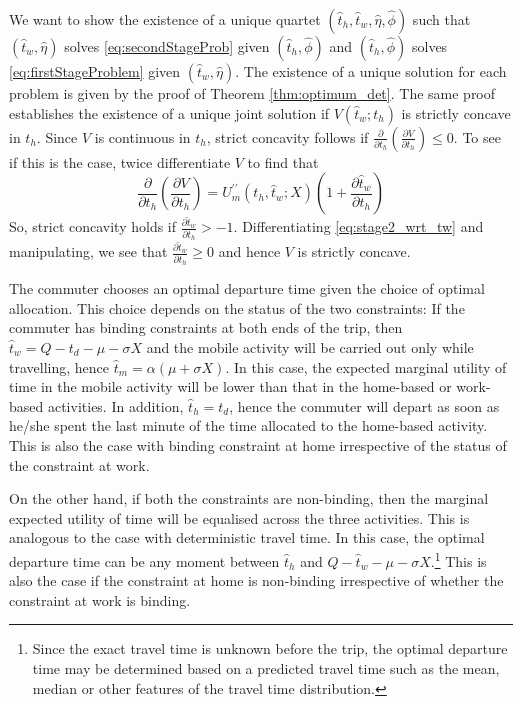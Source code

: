 \documentclass[12pt,a4paper,british]{article}
\makeatletter
\newenvironment{proof}[1][\proofname]{\par
    \normalfont\topsep6\p@\@plus6\p@\relax
    \trivlist
    \itemindent\parindent
    \item[\hskip\labelsep
          \scshape
      #1]\ignorespaces
  }{%
    \endtrivlist\@endpefalse
  }
\providecommand{\proofname}{Proof}
\makeatother
\begin{document}
\begin{proof}
We want to show the existence of a unique quartet $\left( \hat{t}_{h},\hat{t}_{w}, \hat{\eta},\hat{\phi}\right)$ such that $\left( \hat{t}_{w}, \hat{\eta}\right)$ solves \eqref{eq:secondStageProb} given $\left( \hat{t}_{h},\hat{\phi}\right)$ and $\left( \hat{t}_{h},\hat{\phi}\right)$ solves \eqref{eq:firstStageProblem} given $\left( \hat{t}_{w},\hat{\eta}\right)$. The existence of a unique solution for each problem is given by the proof of Theorem \ref{thm:optimum_det}. The same proof establishes the existence of a unique joint solution if $V\left(\hat{t}_{w};t_{h}\right)$ is strictly concave in $t_{h}$. Since $V$ is continuous in $t_{h}$, strict concavity follows if $\frac{\partial}{\partial t_{h}}\left(\frac{\partial V}{\partial t_{h}}\right) \leq 0$. To see if this is the case, twice differentiate $V$ to find that%
\begin{equation*}
\frac{\partial}{\partial t_{h}}\left(\frac{\partial V}{\partial t_{h}}\right) = U_{m}^{\prime\prime} \left(t_{h}, \hat{t}_{w}; X \right) \left( 1 + \frac{\partial\hat{t}_{w}}{\partial t_{h}}\right)
\end{equation*}
So, strict concavity holds if $\frac{\partial\hat{t}_{w}}{\partial t_{h}} > -1$. Differentiating \eqref{eq:stage2_wrt_tw} and manipulating, we see that  $\frac{\partial\hat{t}_{w}} {\partial t_{h}} \geq 0$ and hence $V$ is strictly concave.
\end{proof}


The commuter chooses an optimal departure time given the choice of optimal allocation. This choice depends on the status of the two constraints: If the commuter has binding constraints at both ends of the trip, then $\hat{t}_{w}=Q-t_{d}-\mu-\sigma X$ and the mobile activity will be carried out only while travelling, hence $\hat{t}_{m}=\alpha\left(\mu+\sigma X\right)$. In this case, the expected marginal utility of time in the mobile activity will be lower than that in the home-based or work-based activities. In addition, $\hat{t}_{h}=t_{d}$, hence the commuter will depart as soon as he/she spent the last minute of the time allocated to the home-based activity. This is also the case with binding constraint at home irrespective of the status of the constraint at work.

On the other hand, if both the constraints are non-binding, then the marginal expected utility of time will be equalised across the three activities. This is analogous to the case with deterministic travel time. In this case, the optimal departure time can be any moment between $\hat{t}_{h}$ and $Q-\hat{t}_{w}-\mu-\sigma X$.\footnote{Since the exact travel time is unknown before the trip, the optimal departure time may be determined based on a predicted travel time such as the mean, median or other features of the travel time distribution.} This is also the case if the constraint at home is non-binding irrespective of whether the constraint at work is binding.
\end{document}
